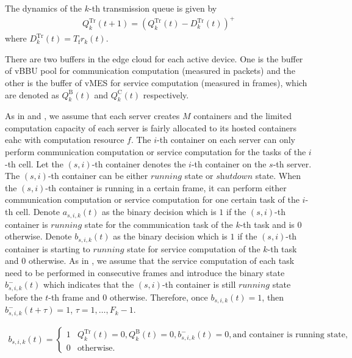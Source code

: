 \documentclass[12pt, draftclsnofoot, onecolumn]{IEEEtran}
\begin{document}
The dynamics of the $k$-th transmission queue is given by
\begin{align}
	Q_{k}^{\mathrm{Tr}}(t+1)=(Q_{k}^{\mathrm{Tr}}(t)-D_{k}^{\mathrm{Tr}}(t))^{+}
\end{align}
where $D_{k}^{\mathrm{Tr}}(t)=T_{\mathrm{f}}r_{k}(t)$.

There are two buffers in the edge cloud for each active device. One is the buffer of vBBU pool for communication computation (measured in packets) and the other is the buffer of vMES for service computation (measured in frames), which are denoted as $Q_{k}^{\mathrm{B}}(t)$ and $Q_{k}^{\mathrm{C}}(t)$ respectively.

As in \cite{6582405} and \cite{8353131}, we assume that each server creates $M$ containers and the limited computation capacity of each server is fairly allocated to its hosted containers eahc with computation resource $f$. The $i$-th container on each server can only perform communication computation or service computation for the tasks of the $i$-th cell. Let the $(s,i)$-th container denotes the $i$-th container on the $s$-th server. The $(s,i)$-th container can be either $\textit{running}$ state or $\textit{shutdown}$ state. When the $(s,i)$-th container is running in a certain frame, it can perform either communication computation or service computation for one certain task of the $i$-th cell. Denote $a_{s,i,k}(t)$ as the binary decision which is $1$ if the $(s,i)$-th container is $\textit{running}$ state for the communication task of the $k$-th task and is $0$ otherwise. Denote $b_{s,i,k}(t)$ as the binary decision which is $1$ if the $(s,i)$-th container is starting to $\textit{running}$ state for service computation of the $k$-th task and $0$ otherwise. As in \cite{}, we assume that the service computation of each task need to be performed in consecutive frames and introduce the binary state $b_{s,i,k}^{-}(t)$ which indicates that the $(s,i)$-th container is still $\textit{running}$ state before the $t$-th frame and $0$ otherwise. Therefore, once $b_{s,i,k}(t)=1$, then $b_{s,i,k}^{-}(t+\tau)=1$, $\tau=1,\ldots,F_{k}-1$.

\begin{align}
	b_{s,i,k}(t)=
	\begin{cases}
		1 &Q_{k}^{\mathrm{Tr}}(t)=0,Q_{k}^{\mathrm{B}}(t)=0,b_{s,i,k}^{-}(t)=0,\text{and container is running state,}\\
		0 &\text{otherwise}.
	\end{cases}
\end{align}
\end{document}
